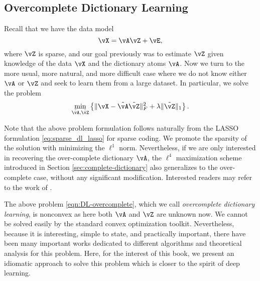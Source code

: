 \documentclass[\toplevelprefix/book-main.tex]{subfiles}
\begin{document}
\subsection{Overcomplete Dictionary Learning} 

Recall that we have the data model 
\begin{equation}
    \vX = \vA\vZ + \vE,
\end{equation}
where \(\vZ\) is sparse, and our goal previously was to estimate \(\vZ\) given knowledge of the data \(\vX\) and the dictionary atoms \(\vA\). Now we turn to the more usual, more natural, and more difficult case where we do not know either \(\vA\) or \(\vZ\) and seek to learn them from a large dataset. In particular, we solve the problem
\begin{equation}
    \min_{\tilde{\vA}, \tilde{\vZ}}\bc{\norm{\vX - \tilde{\vA}\tilde{\vZ}}_{F}^{2} + \lambda \norm{\tilde{\vZ}}_{1}}.
    \label{eqn:DL-overcomplete}
\end{equation}
\begin{remark}
Note that the above problem formulation follows naturally from the LASSO formulation \eqref{eq:sparse_dl_lasso} for sparse coding. We promote the sparsity of the solution with minimizing the \(\ell^1\) norm. Nevertheless, if we are only interested in recovering the over-complete dictionary \(\vA\), the \(\ell^4\) maximization scheme introduced in Section \ref{sec:complete-dictionary} also generalizes to the over-complete case, without any significant modification. Interested readers may refer to the work of \cite{Qu2020Geometric}. 
\end{remark}

The above problem \eqref{eqn:DL-overcomplete}, which we call \textit{overcomplete dictionary learning}, is nonconvex as here both \(\vA\) and \(\vZ\) are unknown now. We cannot be solved easily by the standard convex optimization toolkit. Nevertheless, because it is interesting, simple to state, and practically important, there have been many important works dedicated to different algorithms and theoretical analysis for this problem. Here, for the interest of this book, we present an idiomatic approach to solve this problem which is closer to the spirit of deep learning.
\end{document}

